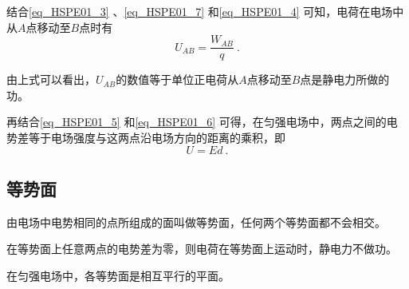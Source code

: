 结合\autoref{eq_HSPE01_3} 、\autoref{eq_HSPE01_7} 和\autoref{eq_HSPE01_4} 可知，电荷在电场中从$A$点移动至$B$点时有
\begin{equation}\label{eq_HSPE01_6}
U_{AB} = \frac{W_{AB}}{q}~.
\end{equation}

由上式可以看出，$U_{AB}$的数值等于单位正电荷从$A$点移动至$B$点是静电力所做的功。

再结合\autoref{eq_HSPE01_5} 和\autoref{eq_HSPE01_6} 可得，在匀强电场中，两点之间的电势差等于电场强度与这两点沿电场方向的距离的乘积，即
\begin{equation}
U=Ed~.
\end{equation}

\subsection{等势面}

由电场中电势相同的点所组成的面叫做等势面，任何两个等势面都不会相交。

在等势面上任意两点的电势差为零，则电荷在等势面上运动时，静电力不做功。

在匀强电场中，各等势面是相互平行的平面。

